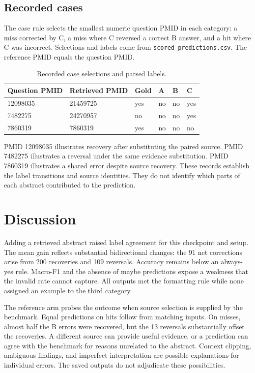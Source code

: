 \documentclass[manuscript,nonacm]{acmart}
\begin{document}
\subsection{Recorded cases}
The case rule selects the smallest numeric question PMID in each category: a miss corrected by C, a miss where C reversed a correct B answer, and a hit where C was incorrect. Selections and labels come from \texttt{scored\_predictions.csv}. The reference PMID equals the question PMID.

\begin{table}[htbp]
\caption{Recorded case selections and parsed labels.}
\label{tab:cases}
\centering
\begin{tabular}{@{}llllll@{}}
\toprule Question PMID & Retrieved PMID & Gold & A & B & C\\\midrule
12098035 & 21459725 & yes & no & no & yes\\
7482275 & 24270957 & no & no & no & yes\\
7860319 & 7860319 & yes & no & no & no\\\bottomrule
\end{tabular}
\end{table}

PMID 12098035 illustrates recovery after substituting the paired source. PMID 7482275 illustrates a reversal under the same evidence substitution. PMID 7860319 illustrates a shared error despite source recovery. These records establish the label transitions and source identities. They do not identify which parts of each abstract contributed to the prediction.

\section{Discussion}
Adding a retrieved abstract raised label agreement for this checkpoint and setup. The mean gain reflects substantial bidirectional changes: the 91 net corrections arise from 200 recoveries and 109 reversals. Accuracy remains below an always-yes rule. Macro-F1 and the absence of maybe predictions expose a weakness that the invalid rate cannot capture. All outputs met the formatting rule while none assigned an example to the third category.

The reference arm probes the outcome when source selection is supplied by the benchmark. Equal predictions on hits follow from matching inputs. On misses, almost half the B errors were recovered, but the 13 reversals substantially offset the recoveries. A different source can provide useful evidence, or a prediction can agree with the benchmark for reasons unrelated to the abstract. Context clipping, ambiguous findings, and imperfect interpretation are possible explanations for individual errors. The saved outputs do not adjudicate these possibilities.
\end{document}
